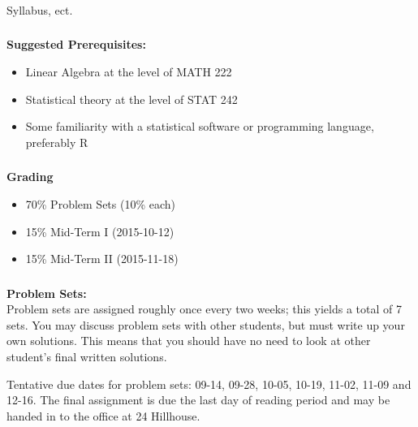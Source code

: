\begin{frame}[fragile] \frametitle{}

\begin{flushright}
{\color{yaleblue}\sc\fontsize{1cm}{0cm}\selectfont Syllabus, ect.}
\end{flushright}

\end{frame}

\begin{frame}[fragile] \frametitle{}

{\bf Suggested Prerequisites:} \pause
\begin{itemize}\setlength\itemsep{0em}
\item Linear Algebra at the level of MATH 222 \pause
\item Statistical theory at the level of STAT 242 \pause
\item Some familiarity with a statistical software or programming language, preferably R
\end{itemize}

\end{frame}


\begin{frame}[fragile] \frametitle{}

{\bf Grading}

\begin{itemize}\setlength\itemsep{0em}
\item 70\% Problem Sets (10\% each) \pause
\item 15\% Mid-Term I (2015-10-12) \pause
\item 15\% Mid-Term II (2015-11-18)
\end{itemize}

\end{frame}

\begin{frame}[fragile] \frametitle{}

{\bf Problem Sets:} \\
Problem sets are assigned roughly once every two weeks;
this yields a total of 7 sets.
You may discuss problem sets with other students, but must write up your
own solutions. This means that you should have no need to look at other
student's final written solutions.

\bigskip

Tentative due dates for problem sets: 09-14, 09-28, 10-05, 10-19, 11-02,
11-09 and 12-16. The final assignment is due the last day of reading period
and may be handed in to the office at 24 Hillhouse.

\end{frame}

